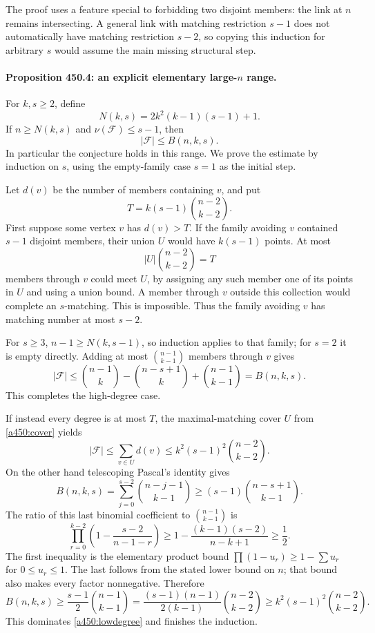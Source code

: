 \documentclass[11pt]{article}
\begin{document}
The proof uses a feature special to forbidding two disjoint members: the link at $n$ remains intersecting. A general link with matching restriction $s-1$ does not automatically have matching restriction $s-2$, so copying this induction for arbitrary $s$ would assume the main missing structural step.

\paragraph{Proposition 450.4: an explicit elementary large-$n$ range.}
For $k,s\geq2$, define
\[
                         N(k,s)=2k^2(k-1)(s-1)+1.
\]
If $n\geq N(k,s)$ and $\nu(\mathcal F)\leq s-1$, then
\begin{equation}\label{a450:largen}
                              |\mathcal F|\leq B(n,k,s).
\end{equation}
In particular the conjecture holds in this range. We prove the estimate by induction on $s$, using the empty-family case $s=1$ as the initial step.

Let $d(v)$ be the number of members containing $v$, and put
\[
                         T=k(s-1)\binom{n-2}{k-2}.
\]
First suppose some vertex $v$ has $d(v)>T$. If the family avoiding $v$ contained $s-1$ disjoint members, their union $U$ would have $k(s-1)$ points. At most
\[
                    |U|\binom{n-2}{k-2}=T
\]
members through $v$ could meet $U$, by assigning any such member one of its points in $U$ and using a union bound. A member through $v$ outside this collection would complete an $s$-matching. This is impossible. Thus the family avoiding $v$ has matching number at most $s-2$.

For $s\geq3$, $n-1\geq N(k,s-1)$, so induction applies to that family; for $s=2$ it is empty directly. Adding at most $\binom{n-1}{k-1}$ members through $v$ gives
\[
 |\mathcal F|\leq
 \binom{n-1}{k}-\binom{n-s+1}{k}
      +\binom{n-1}{k-1}=B(n,k,s).
\]
This completes the high-degree case.

If instead every degree is at most $T$, the maximal-matching cover $U$ from \eqref{a450:cover} yields
\begin{equation}\label{a450:lowdegree}
 |\mathcal F|\leq\sum_{v\in U}d(v)
               \leq k^2(s-1)^2\binom{n-2}{k-2}.
\end{equation}
On the other hand telescoping Pascal's identity gives
\[
 B(n,k,s)=\sum_{j=0}^{s-2}\binom{n-j-1}{k-1}
                  \geq(s-1)\binom{n-s+1}{k-1}.
\]
The ratio of this last binomial coefficient to $\binom{n-1}{k-1}$ is
\[
 \prod_{r=0}^{k-2}\left(1-\frac{s-2}{n-1-r}\right)
       \geq1-\frac{(k-1)(s-2)}{n-k+1}\geq\frac12.
\]
The first inequality is the elementary product bound $\prod(1-u_r)\geq1-\sum u_r$ for $0\leq u_r\leq1$. The last follows from the stated lower bound on $n$; that bound also makes every factor nonnegative. Therefore
\[
 B(n,k,s)\geq\frac{s-1}{2}\binom{n-1}{k-1}
       =\frac{(s-1)(n-1)}{2(k-1)}\binom{n-2}{k-2}
       \geq k^2(s-1)^2\binom{n-2}{k-2}.
\]
This dominates \eqref{a450:lowdegree} and finishes the induction.
\end{document}
